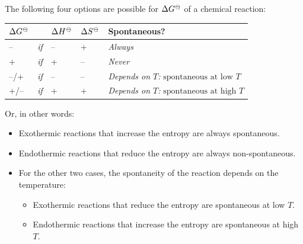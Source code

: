 \documentclass[
  9pt,
]{extbook}
\newcounter{none} %
\providecommand{\tightlist}{%
  \setlength{\itemsep}{0pt}\setlength{\parskip}{0pt}}
\theoremstyle{definition}
\theoremstyle{definition}
\theoremstyle{definition}
\theoremstyle{definition}
\theoremstyle{remark}
\begin{document}
The following four options are possible for \(\Delta G^{-\kern-6pt{\ominus}\kern-6pt-}\) of a chemical reaction:

{\def\LTcaptype{none} %
\begin{longtable}[]{@{}
  >{\centering\arraybackslash}p{}
  >{\raggedright\arraybackslash}p{}
  >{\centering\arraybackslash}p{}
  >{\centering\arraybackslash}p{}
  >{\centering\arraybackslash}p{}@{}}
\toprule\noalign{}
\begin{minipage}[b]{\linewidth}\centering
\(\Delta G^{-\kern-6pt{\ominus}\kern-6pt-}\)
\end{minipage} & \begin{minipage}[b]{\linewidth}\raggedright
\end{minipage} & \begin{minipage}[b]{\linewidth}\centering
\(\Delta H^{-\kern-6pt{\ominus}\kern-6pt-}\)
\end{minipage} & \begin{minipage}[b]{\linewidth}\centering
\(\Delta S^{-\kern-6pt{\ominus}\kern-6pt-}\)
\end{minipage} & \begin{minipage}[b]{\linewidth}\centering
Spontaneous?
\end{minipage} \\
\midrule\noalign{}
\endhead
\bottomrule\noalign{}
\endlastfoot
-- & \emph{if} & -- & + & \emph{Always} \\
+ & \emph{if} & + & -- & \emph{Never} \\
--/+ & \emph{if} & -- & -- & \emph{Depends on \(T\):} \(\scriptstyle{\text{spontaneous at low } T}\) \\
+/-- & \emph{if} & + & + & \emph{Depends on \(T\):} \(\scriptstyle{\text{spontaneous at high } T}\) \\
\end{longtable}
}

Or, in other words:

\begin{itemize}
\tightlist
\item
  Exothermic reactions that increase the entropy are always spontaneous.
\item
  Endothermic reactions that reduce the entropy are always non-spontaneous.
\item
  For the other two cases, the spontaneity of the reaction depends on the temperature:

  \begin{itemize}
  \tightlist
  \item
    Exothermic reactions that reduce the entropy are spontaneous at low \(T\).
  \item
    Endothermic reactions that increase the entropy are spontaneous at high \(T\).
  \end{itemize}
\end{itemize}
\end{document}
